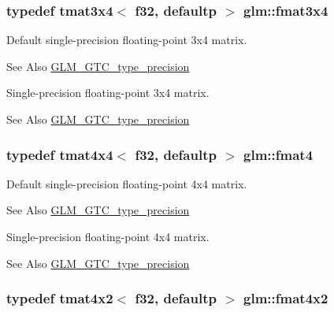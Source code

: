 \hypertarget{group__gtc__type__precision_gad68d9daa91ef05b29e80e044931837cf}{
\subsubsection[{fmat3x4}]{\setlength{\rightskip}{0pt plus 5cm}typedef tmat3x4$<$ f32, defaultp $>$ {\bf glm\-::fmat3x4}}}\label{group__gtc__type__precision_gad68d9daa91ef05b29e80e044931837cf}
Default single-\/precision floating-\/point 3x4 matrix. \begin{DoxySeeAlso}{See Also}
\hyperlink{group__gtc__type__precision}{G\-L\-M\-\_\-\-G\-T\-C\-\_\-type\-\_\-precision}
\end{DoxySeeAlso}
Single-\/precision floating-\/point 3x4 matrix. \begin{DoxySeeAlso}{See Also}
\hyperlink{group__gtc__type__precision}{G\-L\-M\-\_\-\-G\-T\-C\-\_\-type\-\_\-precision} 
\end{DoxySeeAlso}
\hypertarget{group__gtc__type__precision_ga5a7b9713c32b3e8bf6ad41fce25f3205}{
\subsubsection[{fmat4}]{\setlength{\rightskip}{0pt plus 5cm}typedef tmat4x4$<$ f32, defaultp $>$ {\bf glm\-::fmat4}}}\label{group__gtc__type__precision_ga5a7b9713c32b3e8bf6ad41fce25f3205}
Default single-\/precision floating-\/point 4x4 matrix. \begin{DoxySeeAlso}{See Also}
\hyperlink{group__gtc__type__precision}{G\-L\-M\-\_\-\-G\-T\-C\-\_\-type\-\_\-precision}
\end{DoxySeeAlso}
Single-\/precision floating-\/point 4x4 matrix. \begin{DoxySeeAlso}{See Also}
\hyperlink{group__gtc__type__precision}{G\-L\-M\-\_\-\-G\-T\-C\-\_\-type\-\_\-precision} 
\end{DoxySeeAlso}
\hypertarget{group__gtc__type__precision_ga9325d382b334066a4c90a814c9040359}{
\subsubsection[{fmat4x2}]{\setlength{\rightskip}{0pt plus 5cm}typedef tmat4x2$<$ f32, defaultp $>$ {\bf glm\-::fmat4x2}}}\label{group__gtc__type__precision_ga9325d382b334066a4c90a814c9040359}
